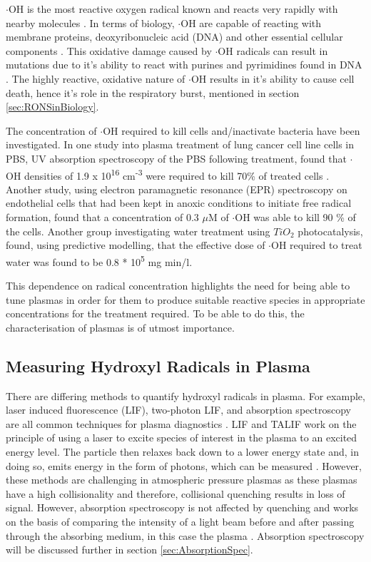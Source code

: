 \documentclass[11pt, oneside]{article}   	%
\begin{document}
$\cdot$OH is the most reactive oxygen radical known and reacts very rapidly with nearby molecules \cite{Halliwell2007}. 
In terms of biology, $\cdot$OH are capable of reacting with membrane proteins, deoxyribonucleic acid (DNA) and other essential cellular components \cite{Block2001}.
This oxidative damage caused by $\cdot$OH radicals can result in mutations due to it's ability to react with purines and pyrimidines found in DNA \cite{Dizdaroglu2012}. 
The highly reactive, oxidative nature of $\cdot$OH results in it's ability to cause cell death, hence it's role in the respiratory burst, mentioned in section \ref{sec:RONSinBiology}.

The concentration of $\cdot$OH required to kill cells and/inactivate bacteria have been investigated.
In one study into plasma treatment of lung cancer cell line cells in PBS, UV absorption spectroscopy of the PBS following treatment, found that $\cdot$OH densities of 1.9 x 10\textsuperscript{16} cm\textsuperscript{-3} were required to kill 70\% of treated cells \cite{Attri2015}.
Another study, using electron paramagnetic resonance (EPR) spectroscopy on endothelial cells that had been kept in anoxic conditions to initiate free radical formation, found that a concentration of 0.3 $\mu$M of $\cdot$OH was able to kill 90 \% of the cells.
Another group investigating water treatment using $TiO_2$ photocatalysis, found, using predictive modelling, that the effective dose of $\cdot$OH required to treat water was found to be 0.8 * 10\textsuperscript{5} mg min/l.

This dependence on radical concentration highlights the need for being able to tune plasmas in order for them to produce suitable reactive species in appropriate concentrations for the treatment required.
To be able to do this, the characterisation of plasmas is of utmost importance.

\subsection{Measuring Hydroxyl Radicals in Plasma}

There are differing methods to quantify hydroxyl radicals in plasma.
For example, laser induced fluorescence (LIF), two-photon LIF, and absorption spectroscopy are all common techniques for plasma diagnostics \cite{Schroter2015}.
LIF and TALIF work on the principle of using a laser to excite species of interest in the plasma to an excited energy level. The particle then relaxes back down to a lower energy state and, in doing so, emits energy in the form of photons, which can be measured \cite{Ono1998}.
However, these methods are challenging in atmospheric pressure plasmas as these plasmas have a high collisionality and therefore, collisional quenching results in loss of signal.
However, absorption spectroscopy is not affected by quenching and works on the basis of comparing the intensity of a light beam before and after passing through the absorbing medium, in this case the plasma \cite{Reuter2015}.
Absorption spectroscopy will be discussed further in section \ref{sec:AbsorptionSpec}.
\end{document}
